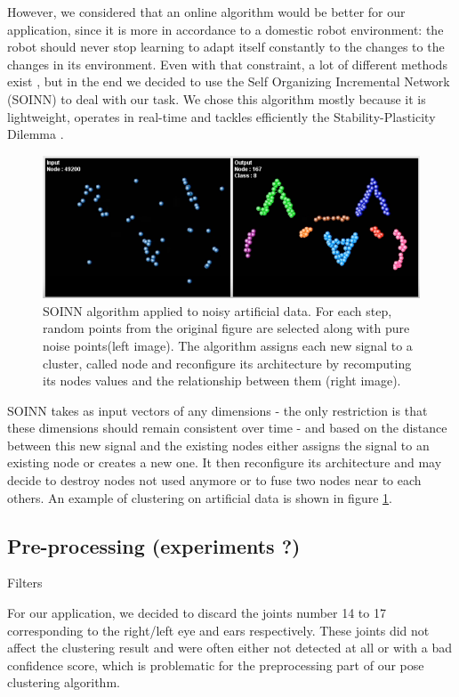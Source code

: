 However, we considered that an online algorithm would be better for our application, since it is more in accordance to a domestic robot environment: the robot should never stop learning to adapt itself constantly to the changes to the changes in its environment. Even with that constraint, a lot of different methods exist \cite{online_clustering_algo}, but in the end we decided to use the Self Organizing Incremental Network (SOINN) \cite{SOINN} to deal with our task. We chose this algorithm mostly because it is lightweight, operates in real-time and tackles efficiently the Stability-Plasticity Dilemma \cite{stability-plasticity_dilemma}. 

\begin{figure}[h]
    \centering
    \includegraphics[width=150mm, keepaspectratio]{images/SOINN_cat.png}
    \caption{SOINN algorithm applied to noisy artificial data. For each step, random points from the original figure are selected along with pure noise points(left image). The algorithm assigns each new signal to a cluster, called node and reconfigure its architecture by recomputing its nodes values and the relationship between them (right image).}
    \label{fig:SOINN_cat}
\end{figure}

SOINN takes as input vectors of any dimensions - the only restriction is that these dimensions should remain consistent over time - and based on the distance between this new signal and the existing nodes either assigns the signal to an existing node or creates a new one. It then reconfigure its architecture and may decide to destroy nodes not used anymore or to fuse two nodes near to each others.
An example of clustering on artificial data is shown in figure \ref{fig:SOINN_cat}. 

\subsection{Pre-processing (experiments ?)}
Filters

For our application, we decided to discard the joints number 14 to 17 corresponding to the right/left eye and ears respectively. These joints did not affect the clustering result and were often either not detected at all or with a bad confidence score, which is problematic for the preprocessing part of our pose clustering algorithm.

